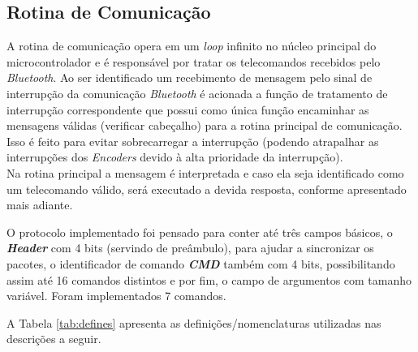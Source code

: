 \subsection{Rotina de Comunicação}
\label{subsec:rotina_comunicacao}
A rotina de comunicação opera em um \emph{loop} infinito no núcleo principal do microcontrolador e é responsável por tratar os telecomandos recebidos pelo \textit{Bluetooth}. Ao ser identificado um recebimento de mensagem pelo sinal de interrupção da comunicação \textit{Bluetooth} é acionada a função de tratamento de interrupção correspondente que possui como única função encaminhar as mensagens válidas (verificar cabeçalho) para a rotina principal de comunicação. Isso é feito para evitar sobrecarregar a interrupção (podendo atrapalhar as interrupções dos \emph{Encoders} devido à alta prioridade da interrupção).\\

Na rotina principal a mensagem é interpretada e caso ela seja identificado como um telecomando válido, será executado a devida resposta, conforme apresentado mais adiante.

O protocolo implementado foi pensado para conter até três campos básicos, o \textbf{\textit{Header}} com 4 bits (servindo de preâmbulo), para ajudar a sincronizar os pacotes, o identificador de comando \textbf{\textit{CMD}} também com 4 bits, possibilitando assim até 16 comandos distintos e por fim, o campo de argumentos com tamanho variável. Foram implementados 7 comandos.



A Tabela \ref{tab:defines} apresenta as definições/nomenclaturas utilizadas nas descrições a seguir.

